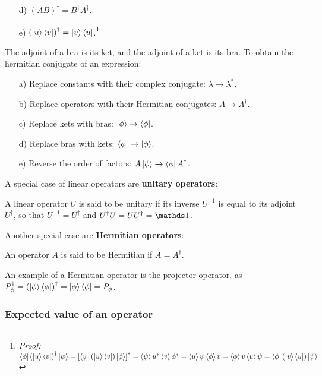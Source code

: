 \begin{itemize}
\begin{enumerate}
        \item[d)] $\left(A B\right)^\dagger = B^\dagger A^\dagger$.
        \item [e)] $\left(\ket{u}\bra{v}\right)^\dagger = \ket{v}\bra{u}$.\footnote{\textit{Proof:} $\bra{\phi}\left(\ket{u}\bra{v}\right)^\dagger\ket{\psi} = \left[\bra{\psi}\left(\ket{u}\bra{v}\right)\ket{\phi}\right]^* = \braket{\psi}{u}^*\braket{v}{\phi}^* = \braket{u}{\psi}\braket{\phi}{v} = \braket{\phi}{v}\braket{u}{\psi} = \bra{\phi}\left(\ket{v}\bra{u}\right)\ket{\psi}$}
    \end{enumerate}
    The adjoint of a bra is its ket, and the adjoint of a ket is its bra.
    To obtain the hermitian conjugate of an expression:
    \begin{enumerate}
        \item[a)] Replace constants with their complex conjugate: $\lambda \to \lambda^*$.
        \item[b)] Replace operators with their Hermitian conjugates: $A\to A^\dagger$.
        \item[c)] Replace kets with bras: $\ket{\phi}\to\bra{\phi}$.
        \item[d)] Replace bras with kets: $\bra{\phi}\to\ket{\phi}$.
        \item[e)] Reverse the order of factors: $A\ket{\phi} \to \bra{\phi}A^\dagger$.

    \end{enumerate}
\end{itemize}

A special case of linear operators are \textbf{unitary operators}:

\begin{definition}
    A linear operator $U$ is said to be unitary if its inverse $U^{-1}$ is equal to its adjoint $U^\dagger$, so that $U^{-1} = U^\dagger$ and $U^\dagger U = UU^\dagger = \Imat$.
\end{definition}

Another special case are \textbf{Hermitian operators}:

\begin{definition}
    An operator $A$ is said to be Hermitian if $A = A^\dagger$.
\end{definition}

An example of a Hermitian operator is the projector operator, as $P_\phi^\dagger = \left(\ket{\phi}\bra{\phi}\right)^\dagger = \ket{\phi}\bra{\phi} = P_\phi$.

\subsubsection{Expected value of an operator}

